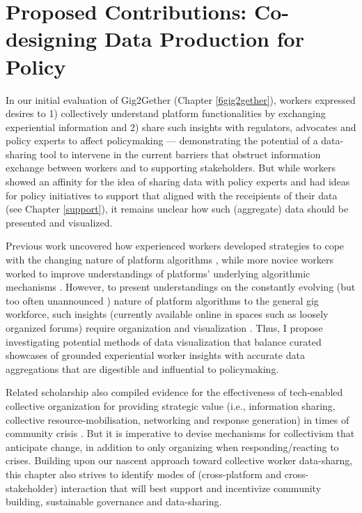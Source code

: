 \chapter{Proposed Contributions: Co-designing Data Production for Policy}\label{proposal} 
In our initial evaluation of Gig2Gether (Chapter \ref{6gig2gether}), workers expressed desires to 1) collectively understand platform functionalities by exchanging experiential information and 2) share such insights with regulators, advocates and policy experts to affect policymaking --- demonstrating the potential of a data-sharing tool to intervene in the current barriers that obstruct information exchange between workers and to supporting stakeholders. But while workers showed an affinity for the idea of sharing data with policy experts and had ideas for policy initiatives to support that aligned with the receipients of their data (see Chapter \ref{support}), it remains unclear how such (aggregate) data should be presented and visualized. 

Previous work uncovered how experienced workers developed strategies to cope with the changing nature of platform algorithms \cite{pacify, Jarrahi2019-if}, while more novice workers worked to improve understandings of platforms' underlying algorithmic mechanisms \cite{peersupport}. However, to present understandings on the constantly evolving (but too often unannounced \cite{6B4U}) nature of platform algorithms to the general gig workforce, such insights (currently available online in spaces such as loosely organized forums) require organization and visualization \cite{peersupport}. Thus, I propose investigating potential methods of data visualization that balance curated showcases of grounded experiential worker insights with accurate data aggregations that are digestible and influential to policymaking. 

Related scholarship also compiled evidence for the effectiveness of tech-enabled collective organization for providing strategic value (i.e., information sharing, collective resource-mobilisation, networking and response generation) in times of community crisis \citep{selforg}. But it is imperative to devise mechanisms for collectivism that anticipate change, in addition to only organizing when responding/reacting to crises. Building upon our nascent approach toward collective worker data-sharng, this chapter also strives to identify modes of (cross-platform and cross-stakeholder) interaction that will best support and incentivize community building, sustainable governance and data-sharing.


